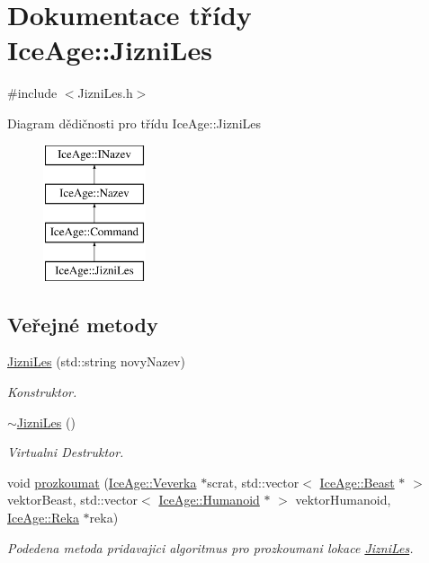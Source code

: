\hypertarget{classIceAge_1_1JizniLes}{}\section{Dokumentace třídy Ice\+Age\+:\+:Jizni\+Les}
\label{classIceAge_1_1JizniLes}


{\ttfamily \#include $<$Jizni\+Les.\+h$>$}

Diagram dědičnosti pro třídu Ice\+Age\+:\+:Jizni\+Les\begin{figure}[H]
\begin{center}
\leavevmode
\includegraphics[height=4.000000cm]{d6/df5/classIceAge_1_1JizniLes}
\end{center}
\end{figure}
\subsection*{Veřejné metody}
\begin{DoxyCompactItemize}
\item 
\hyperlink{classIceAge_1_1JizniLes_a79d20a1e507be9604e9a7b4a1d4068b0}{Jizni\+Les} (std\+::string novy\+Nazev)
\begin{DoxyCompactList}\small\item\em Konstruktor. \end{DoxyCompactList}\item 
\hyperlink{classIceAge_1_1JizniLes_a4dbe10f16bfc6806095c30544c9a530e}{$\sim$\+Jizni\+Les} ()
\begin{DoxyCompactList}\small\item\em Virtualni Destruktor. \end{DoxyCompactList}\item 
void \hyperlink{classIceAge_1_1JizniLes_aa0b6a38d4a469a83cef58d6fd9d53430}{prozkoumat} (\hyperlink{classIceAge_1_1Veverka}{Ice\+Age\+::\+Veverka} $\ast$scrat, std\+::vector$<$ \hyperlink{classIceAge_1_1Beast}{Ice\+Age\+::\+Beast} $\ast$ $>$ vektor\+Beast, std\+::vector$<$ \hyperlink{classIceAge_1_1Humanoid}{Ice\+Age\+::\+Humanoid} $\ast$ $>$ vektor\+Humanoid, \hyperlink{classIceAge_1_1Reka}{Ice\+Age\+::\+Reka} $\ast$reka)
\begin{DoxyCompactList}\small\item\em Podedena metoda pridavajici algoritmus pro prozkoumani lokace \hyperlink{classIceAge_1_1JizniLes}{Jizni\+Les}. \end{DoxyCompactList}\end{DoxyCompactItemize}
